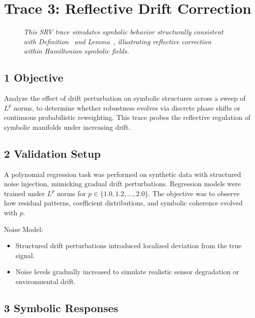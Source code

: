 \section*{Trace 3: Reflective Drift Correction}
\label{section:trace3_reflective_drift_correction}

\begin{figure}[htbp]
\centering
\caption[\textit{SRV trace (summary)}]{\textit{This SRV trace simulates symbolic behavior structurally consistent with Definition~ and Lemma~, illustrating reflective correction within Hamiltonian symbolic fields.}}
\label{figure:trace3_reflective_drift_summary}
\end{figure}

\subsection*{1 Objective}
\label{subsection:trace3_objective}

Analyze the effect of drift perturbation on symbolic structures across a sweep of $L^p$ norms, to determine whether robustness evolves via discrete phase shifts or continuous probabilistic reweighting. This trace probes the reflective regulation of symbolic manifolds under increasing drift.

\subsection*{2 Validation Setup}
\label{subsection:trace3_validation_setup}

A polynomial regression task was performed on synthetic data with structured noise injection, mimicking gradual drift perturbations. Regression models were trained under $L^p$ norms for $p \in \{1.0, 1.2, \ldots, 2.0\}$. The objective was to observe how residual patterns, coefficient distributions, and symbolic coherence evolved with $p$.

Noise Model:
\begin{itemize}
    \item Structured drift perturbations introduced localized deviation from the true signal.
    \item Noise levels gradually increased to simulate realistic sensor degradation or environmental drift.
\end{itemize}

\subsection*{3 Symbolic Responses}
\label{subsection:trace3_symbolic_responses}

